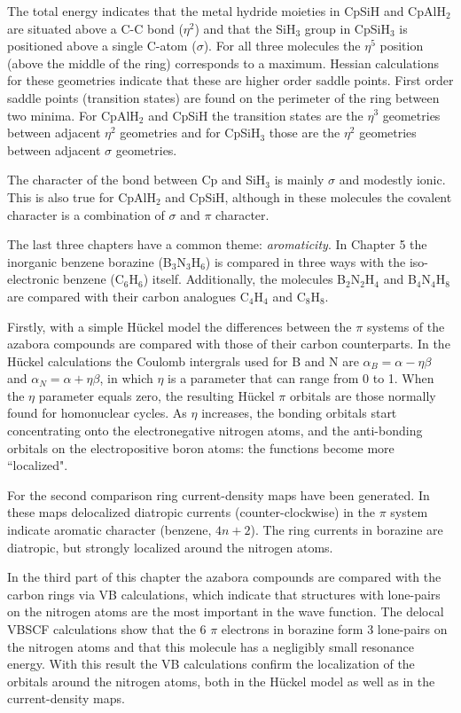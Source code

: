 The total energy indicates that the metal hydride moieties in CpSiH and CpAlH$_2$ are situated above a C-C bond ($\eta^2$) and that the SiH$_3$ group in CpSiH$_3$ is positioned above a single C-atom ($\sigma$). For all three molecules the $\eta^5$ position (above the middle of the ring) corresponds to a maximum. Hessian calculations for these geometries indicate that these are higher order saddle points. First order saddle points (transition states) are found on the perimeter of the ring between two minima. For CpAlH$_2$ and CpSiH the transition states are the $\eta^3$ geometries between adjacent $\eta^2$ geometries and for CpSiH$_3$ those are the $\eta^2$ geometries between adjacent $\sigma$ geometries.

The character of the bond between Cp and SiH$_3$ is mainly $\sigma$ and modestly ionic. This is also true for CpAlH$_2$ and CpSiH, although in these molecules the covalent character is a combination of $\sigma$ and $\pi$ character.

The last three chapters have a common theme: \textit{aromaticity}. In Chapter 5 the inorganic benzene borazine (B$_3$N$_3$H$_6$) is compared in three ways with the iso-electronic benzene (C$_6$H$_6$) itself. Additionally, the molecules B$_2$N$_2$H$_4$ and B$_4$N$_4$H$_8$ are compared with their carbon analogues C$_4$H$_4$ and C$_8$H$_8$. 

Firstly, with a simple H\"uckel model the differences between the $\pi$ systems of the azabora compounds are compared with those of their carbon counterparts. In the H\"uckel calculations the Coulomb intergrals used for B and N are $\alpha_B = \alpha - \eta\beta$ and $\alpha_N = \alpha + \eta\beta$, in which $\eta$ is a parameter that can range from 0 to 1. When the $\eta$ parameter equals zero, the resulting H\"uckel $\pi$ orbitals are those normally found for homonuclear cycles. As $\eta$ increases, the bonding orbitals start concentrating onto the electronegative nitrogen atoms, and the anti-bonding orbitals on the electropositive boron atoms: the functions become more ``localized".

For the second comparison ring current-density maps have been generated. In these maps delocalized diatropic currents (counter-clockwise) in the $\pi$ system indicate aromatic character (benzene, $4n+2$). The ring currents in borazine are diatropic, but strongly localized around the nitrogen atoms.

In the third part of this chapter the azabora compounds are compared with the carbon rings via VB calculations, which indicate that structures with lone-pairs on the nitrogen atoms are the most important in the wave function. The delocal VBSCF calculations show that the 6 $\pi$ electrons in borazine form 3 lone-pairs on the nitrogen atoms and that this molecule has a negligibly small resonance energy. With this result the VB calculations confirm the localization of the orbitals around the nitrogen atoms, both in the H\"uckel model as well as in the current-density maps.

